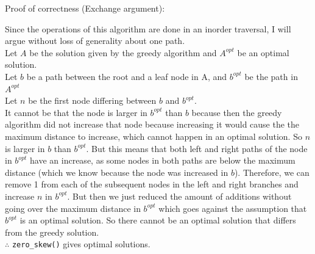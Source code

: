 \documentclass[12pt]{article}
\begin{document}
Proof of correctness (Exchange argument):
\begin{adjustwidth}{10mm}{}
	Since the operations of this algorithm are done in an inorder traversal, I will argue without loss of generality about one path.\\

	Let $A$ be the solution given by the greedy algorithm and $A^{opt}$ be an optimal solution.\\
	Let $b$ be a path between the root and a leaf node in A, and $b^{opt}$ be the path in $A^{opt}$\\
	Let $n$ be the first node differing between $b$ and $b^{opt}$.\\

	It cannot be that the node is larger in $b^{opt}$ than $b$ because then the greedy algorithm did not increase that node because increasing it would cause the the maximum distance to increase,
	which cannot happen in an optimal solution. So $n$ is larger in $b$ than $b^{opt}$.
	But this means that both left and right paths of the node in $b^{opt}$ have an increase,
	as some nodes in both paths are below the maximum distance (which we know because the node was increased in $b$).
	Therefore, we can remove 1 from each of the subsequent nodes in the left and right branches and increase $n$ in $b^{opt}$.
	But then we just reduced the amount of additions without going over the maximum distance in $b^{opt}$ which goes against the assumption that $b^{opt}$ is an optimal solution.
	So there cannot be an optimal solution that differs from the greedy solution.\\

	$\therefore$ \texttt{zero\_skew()} gives optimal solutions.
\end{adjustwidth}~\\[-9mm]
\end{document}
